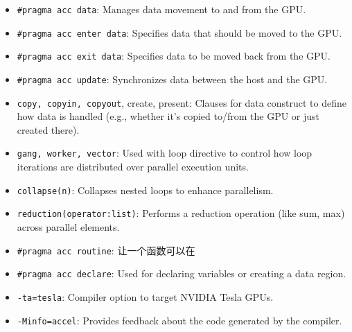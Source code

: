 \begin{itemize}
\item \verb`#pragma acc data`: Manages data movement to and from the GPU.
\item \verb`#pragma acc enter data`: Specifies data that should be moved to the GPU.
\item \verb`#pragma acc exit data`: Specifies data to be moved back from the GPU.
\item \verb`#pragma acc update`: Synchronizes data between the host and the GPU.
\item \verb`copy, copyin, copyout`, create, present: Clauses for data construct to define how data is handled (e.g., whether it's copied to/from the GPU or just created there).
\end{itemize}

\begin{itemize}
\item \verb`gang, worker, vector`: Used with loop directive to control how loop iterations are distributed over parallel execution units.
\item \verb`collapse(n)`: Collapses nested loops to enhance parallelism.
\item \verb`reduction(operator:list)`: Performs a reduction operation (like sum, max) across parallel elements.
\end{itemize}

\begin{itemize}
\item \verb`#pragma acc routine`: 让一个函数可以在 
\item \verb`#pragma acc declare`: Used for declaring variables or creating a data region.
\end{itemize}

\begin{itemize}
\item \verb`-ta=tesla`: Compiler option to target NVIDIA Tesla GPUs.
\item \verb`-Minfo=accel`: Provides feedback about the code generated by the compiler.
\end{itemize}
